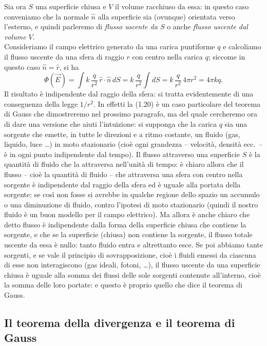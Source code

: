 Sia ora $S$ una superficie chiusa e $V$ il volume racchiuso da essa: in questo caso conveniamo che la normale $\hat n$ alla superficie sia (ovunque) orientata verso l'esterno, e quindi
parleremo di \emph{flusso uscente da $S$} o anche \emph{flusso uscente dal volume $V$}.\\
Consideriamo il campo elettrico generato da una carica puntiforme $q$ e calcoliamo il flusso uscente da una sfera di raggio $r$ con centro nella carica $q$; siccome in questo caso $\hat n=\hat r$, si ha
\begin{equation}
\Phi(\vec E)=\int k\,\frac{q}{r^2}\,\hat r\cdot\hat n\,dS=k\,\frac{q}{r^2}\int dS=k\,\frac{q}{r^2}\,4\pi r^2=4\pi kq.
\tag{1.20}
\end{equation}
Il risultato è indipendente dal raggio della sfera: si tratta evidentemente di una conseguenza della legge $1/r^2$. In effetti la (1.20) è un caso particolare del teorema di Gauss che dimostreremo nel prossimo paragrafo, ma del quale cercheremo ora di dare una versione che aiuti l'intuizione: si supponga che la carica $q$ sia una sorgente che emette, in tutte le direzioni e a ritmo costante, un fluido (gas, liquido, luce \dots) in moto stazionario (cioè ogni grandezza -- velocità, densità ecc.\ -- è in ogni punto indipendente dal tempo). Il flusso attraverso una superficie $S$ è la quantità di fluido che la attraversa nell'unità di tempo: è chiaro allora che il flusso -- cioè la quantità di fluido -- che attraversa una sfera con centro nella sorgente è indipendente dal raggio della sfera ed è uguale alla portata della sorgente: se così non fosse si avrebbe in qualche regione dello spazio un accumulo o una diminuzione di fluido, contro l'ipotesi di moto stazionario (quindi il nostro fluido è un buon modello per il campo elettrico). Ma allora è anche chiaro che detto flusso è indipendente dalla forma della superficie chiusa che contiene la sorgente, e che se la superficie (chiusa) non contiene la sorgente, il flusso totale uscente da essa è nullo: tanto fluido entra e altrettanto esce. Se poi abbiamo tante sorgenti, e se vale il principio di sovrapposizione, cioè i fluidi emessi da ciascuna di esse non interagiscono (gas ideali, fotoni, \dots), il flusso uscente da una superficie chiusa è uguale alla somma dei flussi delle sole sorgenti contenute all'interno, cioè la somma delle loro portate: e questo è proprio quello che dice il teorema di Gauss.

\subsection{Il teorema della divergenza e il teorema di Gauss}

